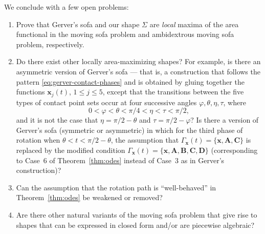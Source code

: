 \documentclass[11pt]{article}
\newcommand{\contact}{\Gamma}
\begin{document}
We conclude with a few open problems:
\begin{enumerate}
\item Prove that Gerver's sofa and our shape $\Sigma$ are \emph{local} maxima of the area functional in the moving sofa problem and ambidextrous moving sofa problem, respectively.

\item Do there exist other locally area-maximizing shapes? For example, is there an asymmetric version of Gerver's sofa --- that is, a construction that follows the pattern \eqref{eq:gerver-contact-phases} and is obtained by gluing together the functions $\mathbf{x}_j(t)$, $1\le j\le 5$, except that the transitions between the five types of contact point sets occur at four successive angles $\varphi, \theta, \eta, \tau$, where 
$$0<\varphi<\theta<\pi/4<\eta<\tau<\pi/2,$$ and it is not the case that $\eta=\pi/2-\theta$ and $\tau=\pi/2-\varphi$? Is there a version of Gerver's sofa (symmetric or asymmetric) in which
for the third phase of rotation when $\theta<t<\pi/2-\theta$, the assumption that $\contact_{\mathbf{x}}(t)=\{ \mathbf{x},\mathbf{A},\mathbf{C} \}$ is replaced by the modified condition 
$\contact_{\mathbf{x}}(t)=\{ \mathbf{x},\mathbf{A}, \mathbf{B}, \mathbf{C}, \mathbf{D} \}$ (corresponding to Case~6 of Theorem~\ref{thm:odes} instead of Case~3 as in Gerver's construction)?

\item Can the assumption that the rotation path is ``well-behaved'' in Theorem~\ref{thm:odes} be weakened or removed?

\item Are there other natural variants of the moving sofa problem that give rise to shapes that can be expressed in closed form and/or are piecewise algebraic?

\end{enumerate}
\end{document}
